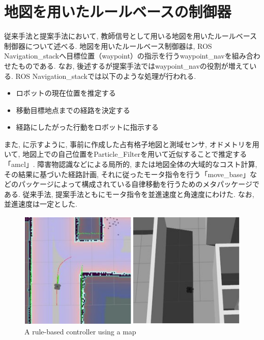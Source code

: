 
\section{地図を用いたルールベースの制御器}
従来手法と提案手法において, 教師信号として用いる地図を用いたルールベース制御器について述べる. 地図を用いたルールベース制御器は, ROS Navigation\_stack\cite{navigation:online}へ目標位置（waypoint）の指示を行うwaypoint\_nav\cite{waypoint_nav:online}を組み合わせたものである. なお, 後述するが提案手法ではwaypoint\_navの役割が増えている. ROS Navigation\_stackでは以下のような処理が行われる. 

\begin{itemize}
  \item ロボットの現在位置を推定する
  \item 移動目標地点までの経路を決定する
  \item 経路にしたがった行動をロボットに指示する
\end{itemize}

また, に示すように, 事前に作成した占有格子地図と測域センサ, オドメトリを用いて, 地図上での自己位置をParticle\_Filterを用いて近似することで推定する「amcl」. 障害物認識などによる局所的, または地図全体の大域的なコスト計算, その結果に基づいた経路計画, それに従ったモータ指令を行う「move\_base」などのパッケージによって構成されている自律移動を行うためのメタパッケージである. 従来手法, 提案手法ともにモータ指令を並進速度と角速度にわけた. なお, 並進速度は一定とした.


\begin{figure}[hbtp]
  \centering
 \includegraphics[keepaspectratio, scale=0.7]
      {images/rule-based.png}
 \caption{A rule-based controller using a map}
 \label{Fig:navigation}
\end{figure}

\newpage